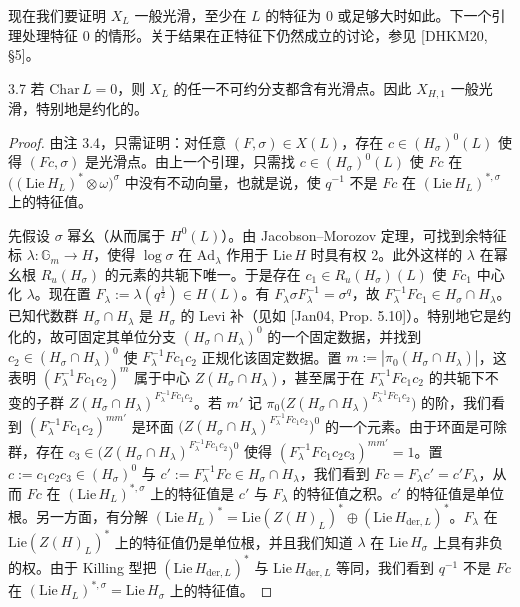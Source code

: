 现在我们要证明 $X_L$ 一般光滑，至少在 $L$ 的特征为 $0$ 或足够大时如此。下一个引理处理特征 $0$ 的情形。关于结果在正特征下仍然成立的讨论，参见 [DHKM20, §5]。

\begin{prop}{3.7}
若 $\mathrm{Char}\,L=0$，则 $X_L$ 的任一不可约分支都含有光滑点。因此 $X_{H,1}$ 一般光滑，特别地是约化的。
\end{prop}

\begin{proof}
由注 3.4，只需证明：对任意 $(F,\sigma)\in X(L)$，存在 $c\in(H_\sigma)^0(L)$ 使得 $(Fc,\sigma)$ 是光滑点。由上一个引理，只需找 $c\in(H_\sigma)^0(L)$ 使 $Fc$ 在 $\bigl((\mathrm{Lie}\,H_L)^*\otimes\omega\bigr)^\sigma$ 中没有不动向量，也就是说，使 $q^{-1}$ 不是 $Fc$ 在 $(\mathrm{Lie}\,H_L)^{*,\sigma}$ 上的特征值。

先假设 $\sigma$ 幂幺（从而属于 $H^0(L)$）。由 Jacobson–Morozov 定理，可找到余特征标 $\lambda:\mathbb G_m\to H$，使得 $\log\sigma$ 在 $\mathrm{Ad}_\lambda$ 作用于 $\mathrm{Lie}\,H$ 时具有权 2。此外这样的 $\lambda$ 在幂幺根 $R_u(H_\sigma)$ 的元素的共轭下唯一。于是存在 $c_1\in R_u(H_\sigma)(L)$ 使 $Fc_1$ 中心化 $\lambda$。现在置 $F_\lambda:=\lambda(q^{\frac12})\in H(L)$。有 $F_\lambda\sigma F_\lambda^{-1}=\sigma^q$，故 $F_\lambda^{-1}Fc_1\in H_\sigma\cap H_\lambda$。已知代数群 $H_\sigma\cap H_\lambda$ 是 $H_\sigma$ 的 Levi 补（见如 [Jan04, Prop. 5.10]）。特别地它是约化的，故可固定其单位分支 $(H_\sigma\cap H_\lambda)^0$ 的一个固定数据，并找到 $c_2\in(H_\sigma\cap H_\lambda)^0$ 使 $F_\lambda^{-1}Fc_1c_2$ 正规化该固定数据。置 $m:=|\pi_0(H_\sigma\cap H_\lambda)|$，这表明 $(F_\lambda^{-1}Fc_1c_2)^m$ 属于中心 $Z(H_\sigma\cap H_\lambda)$，甚至属于在 $F_\lambda^{-1}Fc_1c_2$ 的共轭下不变的子群 $Z(H_\sigma\cap H_\lambda)^{F_\lambda^{-1}Fc_1c_2}$。若 $m'$ 记 $\pi_0\bigl(Z(H_\sigma\cap H_\lambda)^{F_\lambda^{-1}Fc_1c_2}\bigr)$ 的阶，我们看到 $(F_\lambda^{-1}Fc_1c_2)^{mm'}$ 是环面 $\bigl(Z(H_\sigma\cap H_\lambda)^{F_\lambda^{-1}Fc_1c_2}\bigr)^0$ 的一个元素。由于环面是可除群，存在 $c_3\in\bigl(Z(H_\sigma\cap H_\lambda)^{F_\lambda^{-1}Fc_1c_2}\bigr)^0$ 使得 $(F_\lambda^{-1}Fc_1c_2c_3)^{mm'}=1$。置 $c:=c_1c_2c_3\in(H_\sigma)^0$ 与 $c':=F_\lambda^{-1}Fc\in H_\sigma\cap H_\lambda$，我们看到 $Fc=F_\lambda c'=c'F_\lambda$，从而 $Fc$ 在 $(\mathrm{Lie}\,H_L)^{*,\sigma}$ 上的特征值是 $c'$ 与 $F_\lambda$ 的特征值之积。$c'$ 的特征值是单位根。另一方面，有分解 $(\mathrm{Lie}\,H_L)^*=\mathrm{Lie}(Z(H)_L)^*\oplus(\mathrm{Lie}\,H_{\mathrm{der},L})^*$。$F_\lambda$ 在 $\mathrm{Lie}(Z(H)_L)^*$ 上的特征值仍是单位根，并且我们知道 $\lambda$ 在 $\mathrm{Lie}\,H_\sigma$ 上具有非负的权。由于 Killing 型把 $(\mathrm{Lie}\,H_{\mathrm{der},L})^*$ 与 $\mathrm{Lie}\,H_{\mathrm{der},L}$ 等同，我们看到 $q^{-1}$ 不是 $Fc$ 在 $(\mathrm{Lie}\,H_L)^{*,\sigma}=\mathrm{Lie}\,H_\sigma$ 上的特征值。


\end{proof}
